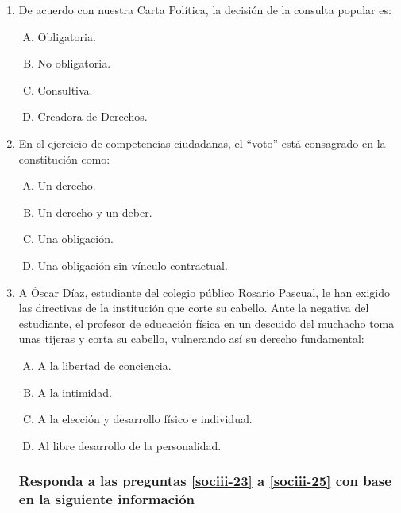 \begin{enumerate}

\item De acuerdo con nuestra Carta Política, la decisión de la consulta popular es:
\label{sociii-20}


\begin{enumerate}[(A)]
\item   Obligatoria.
 \item  No obligatoria.
\item Consultiva.
\item Creadora de Derechos.
\end{enumerate}



\item En el ejercicio de competencias ciudadanas, el ``voto'' está consagrado en la constitución como:\label{sociii-21}


\begin{enumerate}[(A) ]
\item   Un derecho.
 \item  Un derecho y un deber.
\item Una obligación.
\item Una obligación sin vínculo contractual.

\end{enumerate}


\item  A Óscar Díaz, estudiante del colegio público Rosario Pascual, le han exigido las directivas de la institución que corte su cabello. Ante la negativa del estudiante, el profesor de educación física en un descuido del muchacho toma unas tijeras y corta su cabello, vulnerando así su derecho fundamental:
\label{sociii-22}


\begin{enumerate}[(A) ]
\item 	  A la libertad de conciencia.
 \item  A la intimidad.
\item A la elección y desarrollo físico e individual.
\item Al libre desarrollo de la personalidad.
\end{enumerate}

\subsubsection*{Responda a las preguntas \ref{sociii-23} a \ref{sociii-25} con base en la siguiente información}


\end{enumerate}
